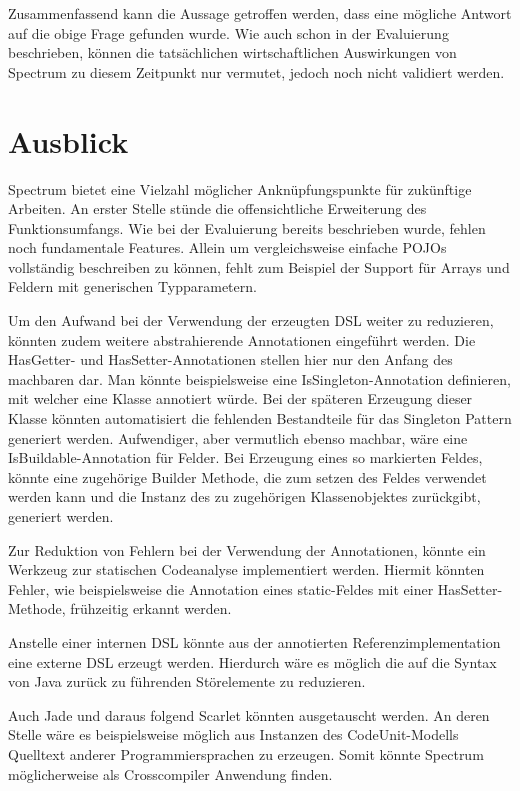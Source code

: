 \documentclass[12pt,oneside,a4paper,parskip]{scrbook}
\begin{document}
Zusammenfassend kann die Aussage getroffen werden, dass eine mögliche Antwort auf die obige Frage gefunden wurde. Wie auch schon in der Evaluierung beschrieben, können die tatsächlichen wirtschaftlichen Auswirkungen von Spectrum zu diesem Zeitpunkt nur vermutet, jedoch noch nicht validiert werden.

\section{Ausblick}

Spectrum bietet eine Vielzahl möglicher Anknüpfungspunkte für zukünftige Arbeiten. An erster Stelle stünde die offensichtliche Erweiterung des Funktionsumfangs. Wie bei der Evaluierung bereits beschrieben wurde, fehlen noch fundamentale Features. Allein um vergleichsweise einfache POJOs vollständig beschreiben zu können, fehlt zum Beispiel der Support für Arrays und Feldern mit generischen Typparametern.

Um den Aufwand bei der Verwendung der erzeugten DSL weiter zu reduzieren, könnten zudem weitere abstrahierende Annotationen eingeführt werden. Die HasGetter- und HasSetter-Annotationen stellen hier nur den Anfang des machbaren dar. Man könnte beispielsweise eine IsSingleton-Annotation definieren, mit welcher eine Klasse annotiert würde. Bei der späteren Erzeugung dieser Klasse könnten automatisiert die fehlenden Bestandteile für das Singleton Pattern generiert werden. Aufwendiger, aber vermutlich ebenso machbar, wäre eine IsBuildable-Annotation für Felder. Bei Erzeugung eines so markierten Feldes, könnte eine zugehörige Builder Methode, die zum setzen des Feldes verwendet werden kann und die Instanz des zu zugehörigen Klassenobjektes zurückgibt, generiert werden.

Zur Reduktion von Fehlern bei der Verwendung der Annotationen, könnte ein Werkzeug zur statischen Codeanalyse implementiert werden. Hiermit könnten Fehler, wie beispielsweise die Annotation eines static-Feldes mit einer HasSetter-Methode, frühzeitig erkannt werden.

Anstelle einer internen DSL könnte aus der annotierten Referenzimplementation eine externe DSL erzeugt werden. Hierdurch wäre es möglich die auf die Syntax von Java zurück zu führenden Störelemente zu reduzieren. 

Auch Jade und daraus folgend Scarlet könnten ausgetauscht werden. An deren Stelle wäre es beispielsweise möglich aus Instanzen des CodeUnit-Modells Quelltext anderer Programmiersprachen zu erzeugen. Somit könnte Spectrum möglicherweise als Crosscompiler Anwendung finden.
\end{document}
